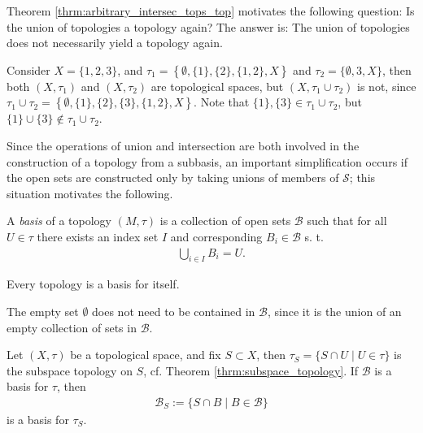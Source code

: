 \begin{remark}
	Theorem \ref{thrm:arbitrary_intersec_tops_top} motivates the following question: Is the union of topologies a topology again? The answer is: The union of topologies does not necessarily yield a topology again.
\end{remark}

\begin{exmp}
	Consider $X = \{1, 2, 3\}$, and $\tau_1 = \left\{\emptyset, \{1\}, \{2\}, \{1, 2\}, X\right\}$ and $\tau_2=\{\emptyset, {3}, X\}$, then both $(X, \tau_1)$ and $(X, \tau_2)$ are topological spaces, but $(X, \tau_1\cup\tau_2)$ is not, since $\tau_1\cup \tau_2 = \left\{ \emptyset, \{1\}, \{2\}, \{3\}, \{1, 2\}, X \right\}$. Note that $\{1\}, \{3\}\in \tau_1\cup \tau_2$, but $\{1\}\cup \{3\}\notin \tau_1\cup\tau_2$.
\end{exmp}

Since the operations of union and intersection are both involved in the construction of a topology from a subbasis, an important simplification occurs if the open sets are constructed only by taking unions of members of $\mathscr S$; this situation motivates the following.

\begin{defn}[Basis]
	A \textit{basis} of a topology $\left(M, \tau\right)$ is a collection of open sets $\mathcal B$ such that for all $U\in \tau$ there exists an index set $I$ and corresponding $B_i\in \mathcal B$ s. t. 
	\begin{align}
		\bigcup_{i\in I}B_i = U. 
	\end{align}
\end{defn}

\begin{exmp}
	Every topology is a basis for itself.
\end{exmp}

\begin{remark}
	The empty set $\emptyset$ does not need to be contained in $\mathscr B$, since it is the union of an empty collection of sets in $\mathscr B$.
\end{remark}

\begin{theorem}\label{thrm:subspace_basis}
	Let $(X, \tau)$ be a topological space, and fix $S\subset X$, then 
	$\tau_S = \{S \cap U \mid U\in \tau\}$ is the subspace topology on $S$, cf. Theorem \ref{thrm:subspace_topology}. If $\mathscr B$ is a basis for $\tau$, then 
	\begin{align}
		\mathscr B_S := \{S \cap B \mid B\in\mathscr B\}
	\end{align}
	is a basis for $\tau_S$.
\end{theorem}

